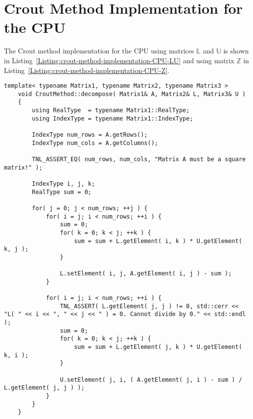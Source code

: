 \newpage 									%
\appendix 								 	%


\chapter{Crout Method Implementation for the CPU}\label{Attachment:crout-method-implementation-CPU}
The Crout method implementation for the CPU using matrices $ \mathbb{L} $ and $ \mathbb{U} $ is shown in Listing~\ref{Listing:crout-method-implementation-CPU-LU} and using matrix $ \mathbb{Z} $ in Listing~\ref{Listing:crout-method-implementation-CPU-Z}.
\begin{lstlisting}[caption={Implementation of the Crout method on the CPU using matrices $ \mathbb{L} $ and $ \mathbb{U} $. All matrix and variable types are obtained from template arguments of the method. Taken from the Decomposition project repository on GitLab\protect\footref{Footnote:decomposition-project-gitlab-url}.},label={Listing:crout-method-implementation-CPU-LU}]
	template< typename Matrix1, typename Matrix2, typename Matrix3 >
	void CroutMethod::decompose( Matrix1& A, Matrix2& L, Matrix3& U )
	{
		using RealType  = typename Matrix1::RealType;
		using IndexType = typename Matrix1::IndexType;
		
		IndexType num_rows = A.getRows();
		IndexType num_cols = A.getColumns();
		
		TNL_ASSERT_EQ( num_rows, num_cols, "Matrix A must be a square matrix!" );
		
		IndexType i, j, k;
		RealType sum = 0;
		
		for( j = 0; j < num_rows; ++j )	{
			for( i = j; i < num_rows; ++i ) {
				sum = 0;
				for( k = 0; k < j; ++k ) {
					sum = sum + L.getElement( i, k ) * U.getElement( k, j );
				}
				
				L.setElement( i, j, A.getElement( i, j ) - sum );
			}
			
			for( i = j; i < num_rows; ++i ) {
				TNL_ASSERT( L.getElement( j, j ) != 0, std::cerr << "L( " << i << ", " << j << " ) = 0. Cannot divide by 0." << std::endl );
				sum = 0;
				for( k = 0; k < j; ++k ) {
					sum = sum + L.getElement( j, k ) * U.getElement( k, i );
				}
				
				U.setElement( j, i, ( A.getElement( j, i ) - sum ) / L.getElement( j, j ) );
			}
		}	
	}
\end{lstlisting}

